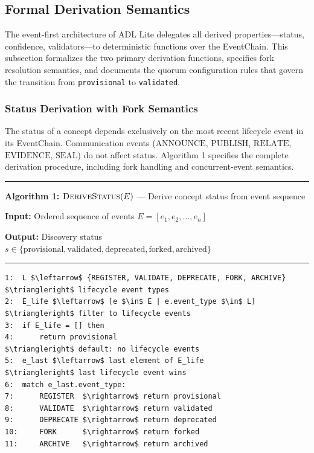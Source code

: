 \subsection{Formal Derivation Semantics}\label{formal-derivation-semantics}

The event-first architecture of ADL Lite delegates all derived properties---status, confidence, validators---to deterministic functions over the EventChain. This subsection formalizes the two primary derivation functions, specifies fork resolution semantics, and documents the quorum configuration rules that govern the transition from \texttt{provisional} to \texttt{validated}.

\subsubsection{Status Derivation with Fork Semantics}\label{status-derivation-with-fork-semantics}

The status of a concept depends exclusively on the most recent lifecycle event in its EventChain. Communication events (\(\text{ANNOUNCE}\), \(\text{PUBLISH}\), \(\text{RELATE}\), \(\text{EVIDENCE}\), \(\text{SEAL}\)) do not affect status. Algorithm 1 specifies the complete derivation procedure, including fork handling and concurrent-event semantics.

\begin{center}\rule{0.5\linewidth}{0.5pt}\end{center}

\textbf{Algorithm 1:} \(\textsc{DeriveStatus}(E)\) --- Derive concept status from event sequence

\textbf{Input:} Ordered sequence of events \(E = [e_1, e_2, \ldots, e_n]\)

\textbf{Output:} Discovery status \(s \in \{\text{provisional}, \text{validated}, \text{deprecated}, \text{forked}, \text{archived}\}\)

\begin{center}\rule{0.5\linewidth}{0.5pt}\end{center}

\begin{verbatim}
1:  L $\leftarrow$ {REGISTER, VALIDATE, DEPRECATE, FORK, ARCHIVE}       $\triangleright$ lifecycle event types
2:  E_life $\leftarrow$ [e $\in$ E | e.event_type $\in$ L]                      $\triangleright$ filter to lifecycle events
3:  if E_life = [] then
4:      return provisional                                     $\triangleright$ default: no lifecycle events
5:  e_last $\leftarrow$ last element of E_life                           $\triangleright$ last lifecycle event wins
6:  match e_last.event_type:
7:      REGISTER  $\rightarrow$ return provisional
8:      VALIDATE  $\rightarrow$ return validated
9:      DEPRECATE $\rightarrow$ return deprecated
10:     FORK      $\rightarrow$ return forked
11:     ARCHIVE   $\rightarrow$ return archived
\end{verbatim}

